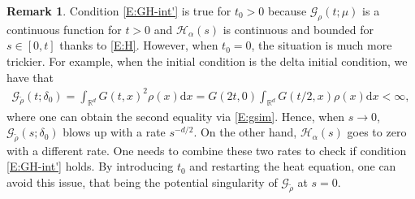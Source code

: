 \documentclass[12pt]{report}
\theoremstyle{plain}
\theoremstyle{definition}
\newtheorem{remark}[theorem]{Remark}
\numberwithin{equation}{section}
\newcommand{\R}{\mathbb{R}}
\newcommand{\ud}{\ensuremath{ \mathrm{d} }}
\begin{document}
\begin{remark}
	Condition \eqref{E:GH-int'} is true for $t_0>0$ because $\mathcal{G}_\rho(t;\mu)$ is a continuous
	function for $t>0$ and $\mathcal{H}_\alpha(s)$ is continuous and bounded for $s\in [0,t]$ thanks
	to \eqref{E:H}. However, when $t_0=0$, the situation is much more trickier. For example, when the
	initial condition is the delta initial condition, we have that
	\begin{align*}
	\mathcal{G}_{\tilde{\rho}}(t;\delta_0)
	= \int_{\R^d} G(t,x)^2 \rho(x) \ud x
	= G(2t,0) \int_{\R^d} G(t/2,x)\rho(x)\ud x
	< \infty,
	\end{align*}
	where one can obtain the second equality via \eqref{E:gsim}. Hence, when $s\to 0$,
	$\mathcal{G}_{\tilde{\rho}}(s;\delta_0)$ blows up with a rate $s^{-d/2}$. On the other hand,
	$\mathcal{H}_\alpha(s)$ goes to zero with a different rate. One needs to combine these two rates
	to check if condition \eqref{E:GH-int'} holds. By introducing $t_0$ and restarting the heat
	equation, one can avoid this issue, that being the potential singularity of
	$\mathcal{G}_{\tilde{\rho}}$ at $s=0$.
\end{remark}
\end{document}
